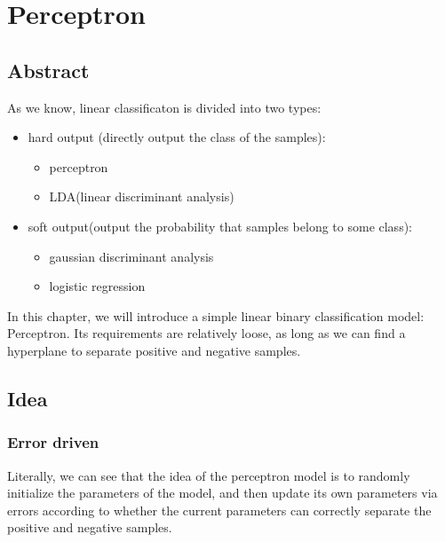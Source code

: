 \documentclass{report}
\begin{document}
\section{Perceptron}
\subsection{Abstract}
As we know, linear classificaton is divided into two types:
\begin{itemize}
	\item hard output (directly output the class of the samples):
	\begin{itemize}
		\item perceptron
		\item LDA(linear discriminant analysis)
	\end{itemize}
	\item soft output(output the probability that samples belong to some class):
	\begin{itemize}
	\item gaussian discriminant analysis
	\item logistic regression
	\end{itemize}
\end{itemize}
In this chapter, we will introduce a simple linear binary classification model: Perceptron. Its requirements are relatively loose, as long as we can find a hyperplane to separate positive and negative samples.
\subsection{Idea}
\subsubsection{Error driven}
Literally, we can see that the idea of the perceptron model is to randomly initialize the parameters of the model, and then update its own parameters via errors according to whether the current parameters can correctly separate the positive and negative samples.
\end{document}
